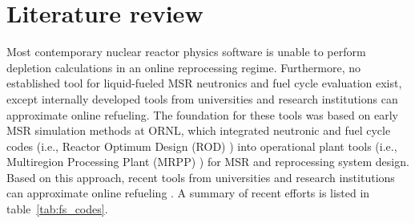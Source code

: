 \section{Literature review}
Most contemporary nuclear reactor physics software is unable to perform depletion calculations in an online reprocessing regime. Furthermore, no established tool for liquid-fueled \gls{MSR} neutronics and fuel cycle evaluation exist, except internally developed tools from universities and research institutions can approximate online refueling. The foundation for these tools was based on early \gls{MSR} simulation methods at \gls{ORNL}, which integrated neutronic and fuel cycle codes (i.e., Reactor 
Optimum Design (ROD) \cite{bauman_rod_1971}) into operational plant tools (i.e., 
Multiregion Processing Plant (MRPP) \cite{kee_mrpp_1976}) for \gls{MSR} and 
reprocessing system design. Based on 
this approach, recent tools from universities and research institutions can
approximate online refueling \cite{serp_molten_2014-1}. A summary of recent
efforts is listed in table~\ref{tab:fs_codes}.
